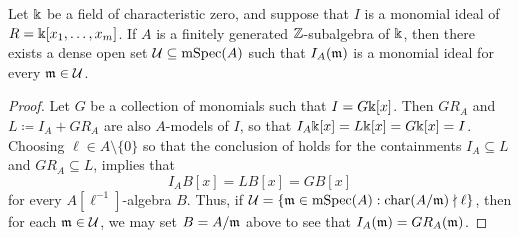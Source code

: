 \documentclass{amsart}
\begin{document}



\begin{corollary}
   \label{expansion of monomial mod most p is monomial: C}
   Let $\Bbbk$ be a field of characteristic zero, and suppose that $I$ is a monomial ideal of $R=\Bbbk[x_1, \ldots, x_m]$.
   If $A$ is a finitely generated $\mathbb{Z}$-subalgebra of $\Bbbk$, then there exists a dense open set $\mathcal{U} \subseteq \operatorname{mSpec}(A)$ such that $I_A(\mathfrak{m})$ is a monomial ideal for every $\mathfrak{m} \in \mathcal{U}$.
\end{corollary}

\begin{proof}
   Let $G$ be a collection of monomials such that $I=G\Bbbk[x]$.
   Then $GR_A$ and $L \coloneqq I_A + G R_A$ are also $A$-models of $I$, so that $I_A \Bbbk[x] = L\Bbbk[x] = G \Bbbk[x] = I$.
   Choosing $\ell \in A \setminus \{0\}$ so that the conclusion of  holds for the containments $I_A \subseteq L$ and $GR_A \subseteq L$,  implies that
      \[
      I_A B[x] = L B[x] = G B[x]
   \]
 for every $A[\ell^{-1}]$-algebra $B$.    Thus, if $\mathcal{U} = \{ \mathfrak{m} \in \operatorname{mSpec}(A) : \operatorname{char}(A/\mathfrak{m}) \nmid \ell \}$,  then for each $\mathfrak{m} \in \mathcal{U}$, we may set $B=A/\mathfrak{m}$ above to see that $I_A(\mathfrak{m}) = G R_A(\mathfrak{m})$.
\end{proof}
\end{document}
